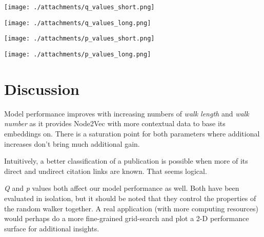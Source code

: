 \documentclass[a4paper,10pt]{article}
\begin{document}

  \begin{minipage}[c][18em][c]{0.49\textwidth}
    \texttt{[image: ./attachments/q\_values\_short.png]}
    \label{fig:q-values:short}
  \end{minipage}
  \hfill
  \begin{minipage}[c][18em][c]{0.49\textwidth}
    \texttt{[image: ./attachments/q\_values\_long.png]}
    \label{fig:q-values:long}
  \end{minipage}

\begin{minipage}[c][18em][c]{0.49\textwidth}
  \texttt{[image: ./attachments/p\_values\_short.png]}
  \label{fig:p-values:short}
\end{minipage}
\hfill
\begin{minipage}[c][18em][c]{0.49\textwidth}
  \texttt{[image: ./attachments/p\_values\_long.png]}
  \label{fig:p-values:long}
\end{minipage}

\section{Discussion}

Model performance improves with increasing numbers of \textit{walk length} and \textit{walk number} as it provides Node2Vec with more contextual data to base its embeddings on. There is a saturation point for both parameters where additional increases don't bring much additional gain.

Intuitively, a better classification of a publication is possible when more of its direct and undirect citation links are known. That seems logical.

\textit{Q} and \textit{p} values both affect our model performance as well. Both have been evaluated in isolation, but it should be noted that they control the properties of the random walker together. A real application (with more computing resources) would perhaps do a more fine-grained grid-search and plot a 2-D performance surface for additional insights.
\end{document}
